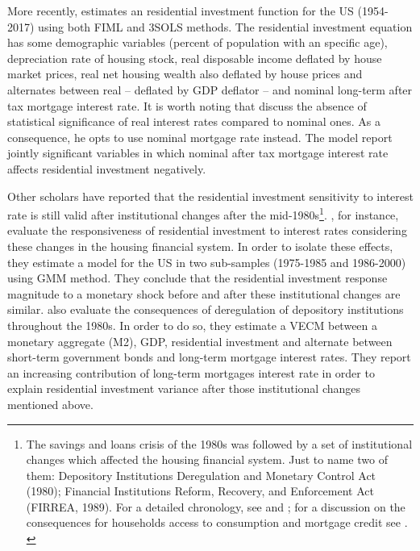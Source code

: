 \documentclass[12pt, a4paper]{article}
\begin{document}
More recently, \textcite{fair_macroeconometric_2018} estimates an residential investment function for the US (1954-2017) using both FIML and 3SOLS methods.
The residential investment equation has some demographic variables (percent of population with an specific age), depreciation rate of housing stock, real disposable income deflated by house market prices, real net housing wealth also deflated by house prices and alternates between real -- deflated by GDP deflator -- and nominal long-term after tax mortgage interest rate.
It is worth noting that \textcite{fair_macroeconometric_2018} discuss the absence of statistical significance of real interest rates compared to nominal ones.
As a consequence, he opts to use nominal mortgage rate instead.
The model report jointly significant variables in which nominal after tax mortgage interest rate affects residential investment negatively.

Other scholars have reported that the residential investment sensitivity to interest rate is still valid after institutional changes after the mid-1980s\footnote{The savings and loans crisis of the 1980s was followed by a set of institutional changes which affected the housing financial system. Just to name two of them: Depository Institutions Deregulation and Monetary Control Act (1980); Financial Institutions Reform, Recovery, and Enforcement Act (FIRREA, 1989). For a detailed chronology, see  \textcite[Appendix B]{mccarthyMonetaryPolicyTransmission2002} and \textcite{green_american_2005}; for a discussion on the consequences for households access to consumption and mortgage credit see \textcite{federal_deposit_insurance_corporation_savings_1997,wall_too_2010}. \label{nota_instituicoes}}.
\textcite{mccarthyMonetaryPolicyTransmission2002}, for instance, evaluate the responsiveness of residential investment to interest rates considering these changes in the housing financial system.
In order to isolate these effects, they estimate  a model for the US in two sub-samples (1975-1985 and 1986-2000) using GMM method.
They conclude that the residential investment response magnitude to a monetary shock before and after these institutional changes are similar.
\textcite{gauger_residential_2003} also evaluate the consequences of deregulation of depository institutions throughout the 1980s.
In order to do so, they estimate a VECM between a monetary aggregate (M2), GDP, residential investment and alternate between short-term government bonds and long-term mortgage interest rates.
They report an increasing contribution of long-term mortgages interest rate in order to explain residential investment variance after those institutional changes mentioned above.
\end{document}
